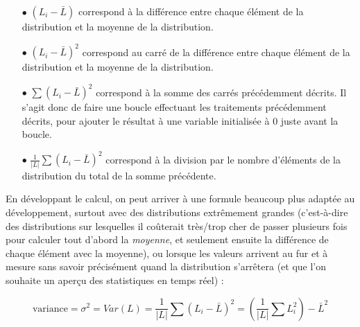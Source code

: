 \begin{itemize}
\item[$\bullet$] $ (L_{i} - \bar{L}) $ correspond à la différence entre chaque élément de la distribution et la moyenne de la distribution.

\item[$\bullet$] $ (L_{i} - \bar{L})^{2} $ correspond au carré de la différence entre chaque élément de la distribution et la moyenne de la distribution.

\item[$\bullet$] $ \sum (L_{i} - \bar{L})^{2} $ correspond à la somme des carrés précédemment décrits. Il s'agit donc de faire une boucle effectuant les traitements précédemment décrits, pour ajouter le résultat à une variable initialisée à $ 0 $ juste avant la boucle.

\item[$\bullet$] $ \frac{1}{|L|} \sum (L_{i} - \bar{L})^{2} $ correspond à la division par le nombre d'éléments de la distribution du total de la somme précédente.
\end{itemize}


\bigskip

\noindent En développant le calcul, on peut arriver à une formule beaucoup plus adaptée au développement, surtout avec des distributions extrêmement grandes (c'est-à-dire des distributions sur lesquelles il coûterait très/trop cher de passer plusieurs fois pour calculer tout d'abord la \textit{moyenne}, et seulement ensuite la différence de chaque élément avec la moyenne), ou lorsque les valeurs arrivent au fur et à mesure sans savoir précisément quand la distribution s'arrêtera (et que l'on souhaite un aperçu des statistiques en temps réel) :

\begin{center}
\begin{equation*}
\text{variance} = \sigma^{2} = Var(L) = \frac{1}{|L|} \sum (L_{i} - \bar{L})^{2} = \left( \frac{1}{|L|} \sum L_{i}^{2} \right) - \bar{L}^{2}
\end{equation*}
\end{center}

\bigskip

